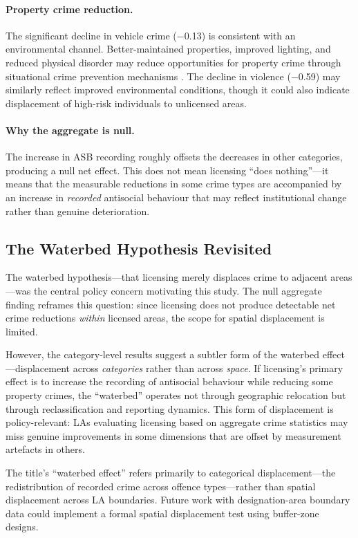 \documentclass[12pt]{article}
\begin{document}
\paragraph{Property crime reduction.} The significant decline in vehicle crime ($-$0.13) is consistent with an environmental channel. Better-maintained properties, improved lighting, and reduced physical disorder may reduce opportunities for property crime through situational crime prevention mechanisms \citep{clarke1995}. The decline in violence ($-$0.59) may similarly reflect improved environmental conditions, though it could also indicate displacement of high-risk individuals to unlicensed areas.

\paragraph{Why the aggregate is null.} The increase in ASB recording roughly offsets the decreases in other categories, producing a null net effect. This does not mean licensing ``does nothing''---it means that the measurable reductions in some crime types are accompanied by an increase in \emph{recorded} antisocial behaviour that may reflect institutional change rather than genuine deterioration.

\subsection{The Waterbed Hypothesis Revisited}

The waterbed hypothesis---that licensing merely displaces crime to adjacent areas---was the central policy concern motivating this study. The null aggregate finding reframes this question: since licensing does not produce detectable net crime reductions \emph{within} licensed areas, the scope for spatial displacement is limited.

However, the category-level results suggest a subtler form of the waterbed effect---displacement across \emph{categories} rather than across \emph{space}. If licensing's primary effect is to increase the recording of antisocial behaviour while reducing some property crimes, the ``waterbed'' operates not through geographic relocation but through reclassification and reporting dynamics. This form of displacement is policy-relevant: LAs evaluating licensing based on aggregate crime statistics may miss genuine improvements in some dimensions that are offset by measurement artefacts in others.

The title's ``waterbed effect'' refers primarily to categorical displacement---the redistribution of recorded crime across offence types---rather than spatial displacement across LA boundaries. Future work with designation-area boundary data could implement a formal spatial displacement test using buffer-zone designs.
\end{document}
